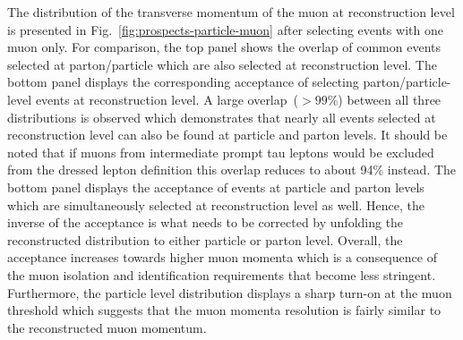 The distribution of the transverse momentum of the muon at reconstruction level is presented in Fig.~\ref{fig:prospects-particle-muon} after selecting events with one muon only. 
For comparison, the top panel shows the overlap of common events selected at parton/particle which are also selected at reconstruction level. The bottom panel displays the corresponding acceptance of selecting parton/particle-level events at reconstruction level. A large overlap~($>99\%$) between all three distributions is observed which demonstrates that nearly all events selected at reconstruction level can also be found at particle and parton levels. 
It should be noted that if muons from intermediate prompt tau leptons would be excluded from the dressed lepton definition this overlap reduces to about 94\% instead. The bottom panel displays the acceptance of events at particle and parton levels which are simultaneously selected at reconstruction level as well. 
Hence, the inverse of the acceptance is what needs to be corrected by unfolding the reconstructed distribution to either particle or parton level. 
Overall, the acceptance increases towards higher muon momenta which is a consequence of the muon isolation and identification requirements that become less stringent. 
Furthermore, the particle level distribution displays a sharp turn-on at the muon \pt threshold which suggests that the muon momenta resolution is fairly similar to the reconstructed muon momentum.


